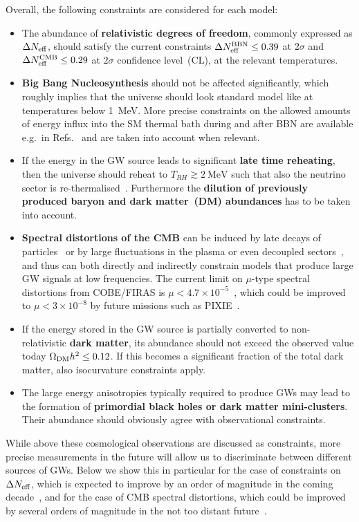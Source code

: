 \documentclass{article}
\begin{document}
Overall, the following constraints are considered for each model:
%
\begin{itemize}  
    \item The abundance of \textbf{relativistic degrees of freedom}, commonly expressed as $\Delta N_{\rm eff}$, should satisfy the current constraints $\Delta N_{\rm eff}^{\rm BBN} \leq 0.39$ at $2\sigma$ and $\Delta N_{\rm eff}^{\rm CMB} \leq 0.29$ at $2\sigma$ \cite{Planck:2018vyg} confidence level~(CL), at the relevant temperatures. 
    \item \textbf{Big Bang Nucleosynthesis} should not be affected significantly, which roughly implies that the universe should look standard model like at temperatures below \SI{1}{\MeV}. More precise constraints on the allowed amounts of energy influx into the SM thermal bath during and after BBN are available e.g.\ in Refs.~\cite{Kawasaki:2000en,Bai:2021ibt} and are taken into account when relevant. 
    \item If the energy in the GW source leads to significant \textbf{late time reheating}, then the universe should reheat to $T_{RH} \gtrsim \SI{2}{\MeV}$ such that also the neutrino sector is re-thermalised~\cite{Bai:2021ibt,deSalas:2015glj}. Furthermore the \textbf{dilution of previously produced baryon and dark matter~(DM) abundances} has to be taken into account. 
    \item \textbf{Spectral distortions of the CMB} can be induced by late decays of particles~\cite{Chluba:2011hw,Chluba:2013pya} or by large fluctuations in the plasma or even decoupled sectors~\cite{Chluba:2019kpb,Ramberg:2022irf}, and thus can both directly and indirectly constrain models that produce large GW signals at low frequencies. The current limit on $\mu$-type spectral distortions from COBE/FIRAS is $\mu < 4.7\times 10^{-5}$~\cite{Bianchini:2022dqh}, which could be improved to $\mu < 3\times 10^{-8}$ by future missions such as PIXIE~\cite{Kite:2020uix}.
    \item If the energy stored in the GW source is partially converted to non-relativistic \textbf{dark matter}, its abundance should not exceed the observed value today $\Omega_{\rm DM}h^2 \leq 0.12$. If this becomes a significant fraction of the total dark matter, also isocurvature constraints apply. 
    \item The large energy anisotropies typically required to produce GWs may lead to the formation of \textbf{primordial black holes or dark matter mini-clusters}. Their abundance should obviously agree with observational constraints. 
\end{itemize}
%
While above these cosmological observations are discussed as constraints, more precise measurements in the future will allow us to discriminate between different sources of GWs. Below we show this in particular for the case of constraints on $\Delta N_{\rm eff}$, which is expected to improve by an order of magnitude in the coming decade~\cite{CMB-S4:2016ple,SimonsObservatory:2018koc}, and for the case of CMB spectral distortions, which could be improved by several orders of magnitude in the not too distant future~\cite{Kogut:2011xw,Chluba:2019nxa}.
\end{document}
